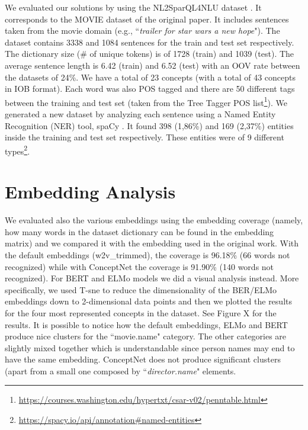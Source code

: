 \documentclass[11pt,a4paper]{article}
\begin{document}
We evaluated our solutions by using the NL2SparQL4NLU dataset \cite{Chen2014DerivingLR, gobbi}. It corresponds to the MOVIE dataset of the original paper. It includes sentences taken from the movie domain (e.g., ``\textit{trailer for star wars a new hope}"). The dataset contains 3338 and 1084 sentences for the train and test set respectively. The dictionary size (\# of unique tokens) is of 1728 (train) and 1039 (test). The average sentence length is 6.42 (train) and 6.52 (test) with an OOV rate between the datasets of 24\%. We have a total of 23 concepts (with a total of 43 concepts in IOB format). Each word was also POS tagged and there are 50 different tags between the training and test set (taken from the Tree Tagger POS list\footnote{\url{https://courses.washington.edu/hypertxt/csar-v02/penntable.html}}).
We generated a new dataset by analyzing each sentence using a Named Entity Recognition (NER) tool, spaCy \cite{spacy}. It found 398 (1,86\%)  and 169 (2,37\%) entities inside the training and test set respectively. These entities were of 9 different types\footnote{\url{https://spacy.io/api/annotation\#named-entities}}.

\section{Embedding Analysis}
We evaluated also the various embeddings using the embedding coverage (namely, how many words in the dataset dictionary can be found in the embedding matrix) and we compared it with the embedding used in the original work. With the default embeddings (w2v\_trimmed), the coverage is 96.18\% (66 words not recognized) while with ConceptNet the coverage is 91.90\% (140 words not recognized). For BERT and ELMo models we did a visual analysis instead. More specifically, we used T-sne \cite{Maaten2008VisualizingDU} to reduce the dimensionality of the BER/ELMo embeddings down to 2-dimensional data points and then we plotted the results for the four most represented concepts in the dataset. See Figure X for the results. It is possible to notice how the default embeddings, ELMo and BERT produce nice clusters for the ``movie.name" category. The other categories are slightly mixed together which is understandable since person names may end to have the same embedding. ConceptNet does not produce significant clusters (apart from a small one composed by ``\textit{director.name}" elements.
\end{document}
